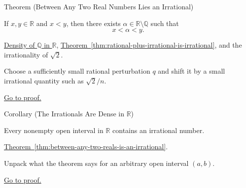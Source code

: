 \begin{theorembox}{Theorem (Between Any Two Real Numbers Lies an Irrational)}
\begin{theorem}
\label{thm:between-any-two-reals-is-an-irrational}
If $x,y\in\mathbb{R}$ and $x<y$, then there exists
$\alpha\in\mathbb{R}\setminus\mathbb{Q}$ such that
\[
x<\alpha<y.
\]
\end{theorem}
\end{theorembox}
\begin{dependencies}
\hyperref[thm:q-dense-in-r]{Density of $\mathbb{Q}$ in $\mathbb{R}$},
\hyperref[thm:rational-plus-irrational-is-irrational]{Theorem~\ref*{thm:rational-plus-irrational-is-irrational}},
and the irrationality of $\sqrt{2}$.
\end{dependencies}
\begin{remark*}
Choose a sufficiently small rational perturbation $q$ and shift it by a small
irrational quantity such as $\sqrt{2}/n$.
\end{remark*}
\begin{remark*}[Proof]
\hyperref[prf:between-any-two-reals-is-an-irrational]{Go to proof.}
\end{remark*}

\begin{corollarybox}{Corollary (The Irrationals Are Dense in $\mathbb{R}$)}
\begin{corollary}
\label{cor:irrationals-dense-in-r}
Every nonempty open interval in $\mathbb{R}$ contains an irrational number.
\end{corollary}
\end{corollarybox}
\begin{dependencies}
\hyperref[thm:between-any-two-reals-is-an-irrational]{Theorem~\ref*{thm:between-any-two-reals-is-an-irrational}}.
\end{dependencies}
\begin{remark*}
Unpack what the theorem says for an arbitrary open interval $(a,b)$.
\end{remark*}
\begin{remark*}[Proof]
\hyperref[prf:irrationals-dense-in-r]{Go to proof.}
\end{remark*}


